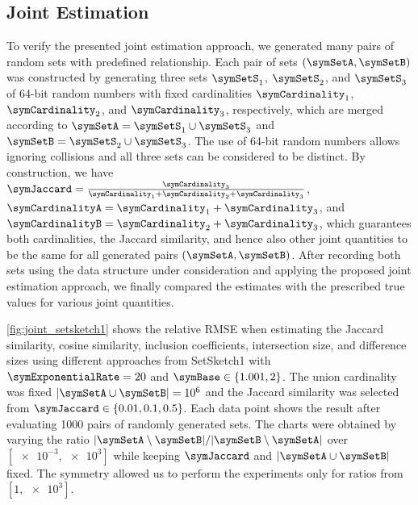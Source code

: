 \documentclass[sigconf, nonacm]{acmart}
\begin{document}
\subsection{Joint Estimation}

To verify the presented joint estimation approach, we generated many pairs of random sets with predefined relationship.
Each pair of sets $(\symSetA, \symSetB)$ was constructed by generating three sets $\symSetS_1$, $\symSetS_2$, and $\symSetS_3$ of 64-bit random numbers with fixed cardinalities $\symCardinality_1$, $\symCardinality_2$, and $\symCardinality_3$, respectively, which are merged according to $\symSetA = \symSetS_1\cup \symSetS_3$ and $\symSetB = \symSetS_2\cup \symSetS_3$.
The use of 64-bit random numbers allows ignoring collisions and all three sets can be considered to be distinct. By construction, we have $\symJaccard = \frac{\symCardinality_3}{\symCardinality_1+\symCardinality_2+\symCardinality_3}$, $\symCardinalityA=\symCardinality_1+\symCardinality_3$, and $\symCardinalityB=\symCardinality_2+\symCardinality_3$, which guarantees both cardinalities, the Jaccard similarity, and hence also other joint quantities to be the same for all generated pairs $(\symSetA,\symSetB)$.
After recording both sets using the data structure under consideration and applying the proposed joint estimation approach, we finally compared the estimates with the prescribed true values for various joint quantities.

\cref{fig:joint_setsketch1} shows the relative \ac{RMSE} when estimating the Jaccard similarity, cosine similarity, inclusion coefficients, intersection size, and difference sizes using different approaches from SetSketch1 with $\symExponentialRate=20$ and $\symBase\in\lbrace 1.001,2\rbrace$. The union cardinality was fixed $|\symSetA\cup\symSetB|=\num{e6}$ and the Jaccard similarity was selected from $\symJaccard \in\lbrace 0.01, 0.1, 0.5\rbrace$. Each data point shows the result after evaluating 1000 pairs of randomly generated sets. The charts were obtained by varying the ratio $|\symSetA\setminus\symSetB|/|\symSetB\setminus\symSetA|$ over $[\num{e-3},\num{e3}]$ while keeping $\symJaccard$ and $|\symSetA\cup\symSetB|$ fixed. The symmetry allowed us to perform the experiments only for ratios from $[1,\num{e3}]$.
\end{document}
